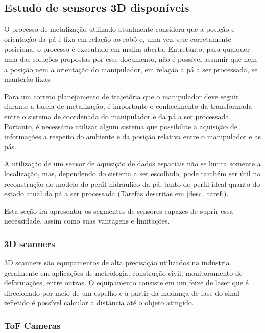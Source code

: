 \subsection{Estudo de sensores 3D disponíveis}

O processo de metalização utilizado atualmente considera que a posição e
orientação da pá é fixa em relação ao robô e, uma vez, que corretamente
posiciona, o processo é executado em malha aberta. Entretanto, para qualquer uma
das soluções propostas por esse documento, não é possível assumir que nem a
posição nem a orientação do manipulador, em relação a pá a ser processada, se
manterão fixas.

Para um correto planejamento de trajetória que o manipulador deve seguir durante
a tarefa de metalização, é importante o conhecimento da transformada entre o
sistema de coordenada do manipulador e da pá a ser processada. Portanto, é
necessário utilizar algum sistema que possibilite a aquisição de informações a
respeito do ambiente e da posição relativa entre o manipulador e as pás.

A utilização de um sensor de aquisição de dados espaciais não se limita somente
a localização, mas, dependendo do sistema a ser escolhido, pode também ser útil
na reconstrução do modelo do perfil hidráulico da pá, tanto do perfil ideal
quanto do estado atual da pá a ser processada (Tarefas descritas em
\ref{desc_taref}).

Esta seção irá apresentar os segmentos de sensores capazes de suprir essa
necessidade, assim como suas vantagens e limitações. 


\subsubsection{3D scanners}

3D scanners são equipamentos de alta precisação utilizados na indústria
geralmente em aplicações de metrologia, construção civil, monitoramento de
deformações, entre outras. O equipamento consiste em um feixe de laser que é
direcionado por meio de um espelho e a partir da mudança de fase do sinal
refletido é possível calcular a distância até o objeto atingido.




\subsubsection{ToF Cameras}

